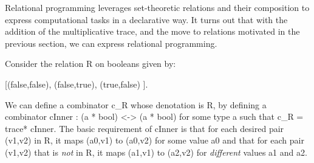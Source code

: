 \documentclass[preprint]{sigplanconf}
\begin{document}
Relational programming leverages set-theoretic relations and their
composition to express computational tasks in a declarative way. 
It turns out that with the addition of the multiplicative trace, and
the move to relations motivated in the previous section, we can
express relational programming.

Consider the relation {{R}} on booleans given by:

{{ {[(false,false), (false,true), (true,false) ]}. }}

\noindent We can define a combinator {{c_R}} whose denotation is {{R}}, by
defining a combinator {{cInner : (a * bool) <-> (a * bool)}} for some type
{{a}} such that {{c_R = trace* cInner}}. The basic requirement of {{cInner}}
is that for each desired pair {{(v1,v2)}} in {{R}}, it maps {{(a0,v1)}} to
{{(a0,v2)}} for some value {{a0}} and that for each pair {{(v1,v2)}} that is
\emph{not} in {{R}}, it maps {{(a1,v1)}} to {{(a2,v2)}} for \emph{different}
values {{a1}} and {{a2}}. 

\end{document}
